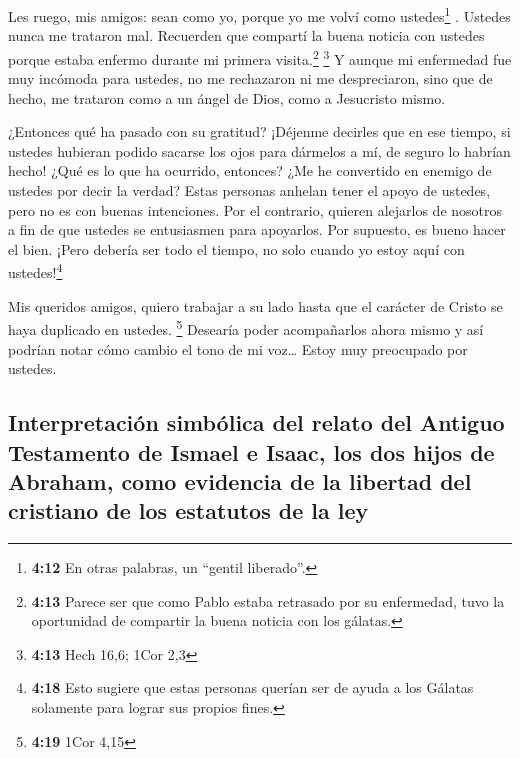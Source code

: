  Les ruego, mis amigos: sean como yo, porque yo me volví
como ustedes\footnote{\textbf{4:12} En otras palabras, un ``gentil
  liberado''.} . Ustedes nunca me trataron mal. 
Recuerden que compartí la buena noticia con ustedes porque estaba
enfermo durante mi primera visita.\footnote{\textbf{4:13} Parece ser que
  como Pablo estaba retrasado por su enfermedad, tuvo la oportunidad de
  compartir la buena noticia con los gálatas.} \footnote{\textbf{4:13}
  Hech 16,6; 1Cor 2,3}  Y aunque mi enfermedad fue muy
incómoda para ustedes, no me rechazaron ni me despreciaron, sino que de
hecho, me trataron como a un ángel de Dios, como a Jesucristo mismo.

 ¿Entonces qué ha pasado con su gratitud? ¡Déjenme
decirles que en ese tiempo, si ustedes hubieran podido sacarse los ojos
para dármelos a mí, de seguro lo habrían hecho!  ¿Qué es
lo que ha ocurrido, entonces? ¿Me he convertido en enemigo de ustedes
por decir la verdad?  Estas personas anhelan tener el
apoyo de ustedes, pero no es con buenas intenciones. Por el contrario,
quieren alejarlos de nosotros a fin de que ustedes se entusiasmen para
apoyarlos.  Por supuesto, es bueno hacer el bien. ¡Pero
debería ser todo el tiempo, no solo cuando yo estoy aquí con
ustedes!\footnote{\textbf{4:18} Esto sugiere que estas personas querían
  ser de ayuda a los Gálatas solamente para lograr sus propios fines.}

 Mis queridos amigos, quiero trabajar a su lado hasta que
el carácter de Cristo se haya duplicado en ustedes. \footnote{\textbf{4:19}
  1Cor 4,15}  Desearía poder acompañarlos ahora mismo y
así podrían notar cómo cambio el tono de mi voz\ldots{} Estoy muy
preocupado por ustedes.

\hypertarget{interpretaciuxf3n-simbuxf3lica-del-relato-del-antiguo-testamento-de-ismael-e-isaac-los-dos-hijos-de-abraham-como-evidencia-de-la-libertad-del-cristiano-de-los-estatutos-de-la-ley}{%
\subsection{Interpretación simbólica del relato del Antiguo Testamento
de Ismael e Isaac, los dos hijos de Abraham, como evidencia de la
libertad del cristiano de los estatutos de la
ley}\label{interpretaciuxf3n-simbuxf3lica-del-relato-del-antiguo-testamento-de-ismael-e-isaac-los-dos-hijos-de-abraham-como-evidencia-de-la-libertad-del-cristiano-de-los-estatutos-de-la-ley}}

